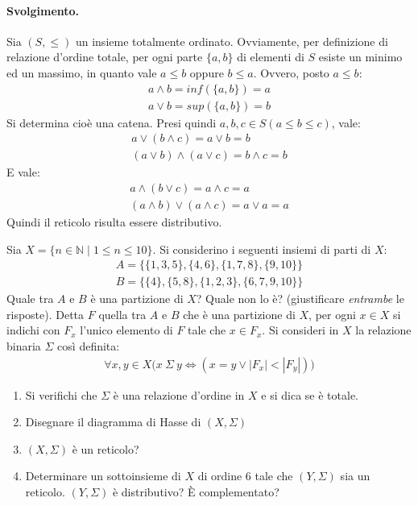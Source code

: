 \paragraph{Svolgimento.} Sia $(S,\leq)$ un insieme totalmente ordinato. Ovviamente, per definizione di relazione d'ordine totale, per ogni parte $\{a,b\}$ di elementi di $S$ esiste un minimo ed un massimo, in quanto vale $a \leq b$ oppure $b \leq a$. Ovvero, posto $a \leq b$:
\begin{align*}
	a \wedge b = inf(\{a,b\}) = a \\
	a \vee b =  sup(\{a,b\}) = b
\end{align*}Si determina cioè una catena. Presi quindi $a,b,c \in S(a \leq b \leq c)$, vale:
\begin{align*}
	a \vee (b \wedge c) =  a \vee b = b \\
	(a \vee b) \wedge (a \vee c) = b \wedge c = b
\end{align*}
E vale:
\begin{align*}
	a \wedge(b \vee c) = a \wedge c  = a\\
	(a \wedge b) \vee (a \wedge c) = a \vee a = a 
\end{align*}
Quindi il reticolo risulta essere distributivo. \hfill \blacksquare
\begin{exsbox}
	Sia $X=\{n \in \mathbb{N} \; | \; 1 \leq n \leq 10\}$. Si considerino i seguenti insiemi di parti di $X$:
	\begin{align*}
		A = \bigl\{\{1,3,5\},\{4,6\}, \{1,7,8\},\{9,10\}\bigr\} \\
		B= \bigl\{\{4\}, \{5,8\},\{1,2,3\},\{6,7,9,10\}\bigr\}
	\end{align*}
Quale tra $A$ e $B$ è una partizione di $X$? Quale non lo è? (giustificare \textit{entrambe} le risposte).
Detta $F$ quella tra $A$ e $B$ che è una partizione di $X$, per ogni $x \in X$ si indichi con $F_{x}$ l'unico elemento di $F$ tale che $x \in F_{x}$. Si consideri in $X$ la relazione binaria $\Sigma$ così definita:
\begin{align*}
	\forall x,y \in X \bigl(x \ \Sigma \ y \iff (x=y \lor |F_{x}| < |F_{y}|)\bigr)
\end{align*}
\begin{enumerate}[label=(\textit{\roman*})]
	\item Si verifichi che $\Sigma$ è una relazione d'ordine in $X$ e si dica se è totale.
	\item Disegnare il diagramma di Hasse di $(X,\Sigma)$
	\item $(X,\Sigma)$ è un reticolo?
	\item Determinare un sottoinsieme di $X$ di ordine 6 tale che $(Y,\Sigma)$ sia un reticolo. $(Y,\Sigma)$ è distributivo? È complementato?
\end{enumerate}
\end{exsbox}
